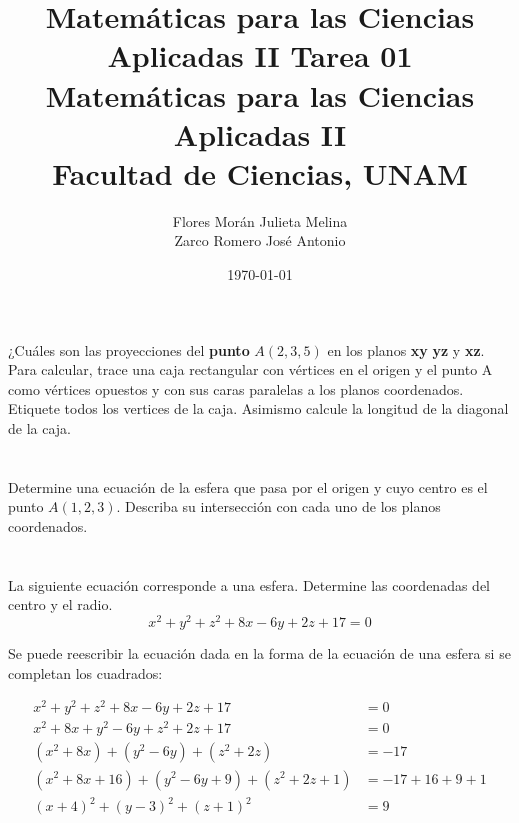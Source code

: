 \documentclass[12pt]{article}
\title{Matemáticas para las Ciencias Aplicadas II}
\title{
	\textbf{Tarea 01} \\
	\vspace{1ex}
	\large Matemáticas para las Ciencias Aplicadas II \\
	Facultad de Ciencias, UNAM}
\date{\today}
\author{Flores Morán Julieta Melina \\ Zarco Romero José Antonio}
\begin{document}
\maketitle

\section{}

¿Cuáles son las proyecciones del \textbf{punto} $A(2,3,5)$ en los planos \textbf{xy} \textbf{yz} y \textbf{xz}. Para calcular, trace una caja rectangular con vértices en el origen y el punto A como vértices opuestos y con sus caras paralelas a los planos coordenados. Etiquete todos los vertices de la caja. Asimismo calcule la longitud de la diagonal de la caja.

\section{}

Determine una ecuación de la esfera que pasa por el origen y cuyo centro es el punto $A(1,2,3)$. Describa su intersección con cada uno de los planos coordenados.

\section{}

La siguiente ecuación corresponde a una esfera. Determine las coordenadas del centro y el radio.
\[ x^2 + y^2 + z^2 + 8x - 6y + 2z + 17 = 0 \]

Se puede reescribir la ecuación dada en la forma de la ecuación de una esfera si se completan los cuadrados:

\begin{equation*}
  \begin{split}
    x^2 + y^2 + z^2 + 8x - 6y + 2z + 17 &= 0 \\
    x^2 + 8x + y^2 - 6y + z^2 + 2z + 17 &= 0 \\
    (x^2 + 8x) + (y^2 - 6y) + (z^2 + 2z) &= - 17 \\
    (x^2 + 8x + 16) + (y^2 - 6y + 9) + (z^2 + 2z + 1) &= - 17 + 16 + 9 + 1\\
    (x + 4)^2 + (y - 3)^2 + (z + 1)^2 &= 9 \\
  \end{split}
\end{equation*}
\end{document}
